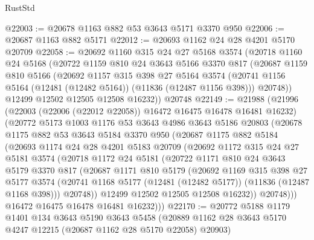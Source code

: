 \begin{lexlean}{RustStd}
\begin{coremodule}
@22003 := @20678 @1163 @882 @53 @3643 @5171 @3370 @950
@22006 := @20687 @1163 @882 @5171
@22012 := @20693 @1162 @24 @28 @4201 @5170 @20709
@22058 := @20692
    @1160
    @315
    @24
    @27
    @5168
    @3574
    (@20718
      @1160
      @24
      @5168
      (@20722
        @1159
        @810
        @24
        @3643
        @5166
        @3370
        @817
        (@20687
          @1159
          @810
          @5166
          (@20692
            @1157
            @315
            @398
            @27
            @5164
            @3574
            (@20741 @1156 @5164 (@12481 (@12482 @5164)) (@11836 (@12487 @1156 @398)))
            @20748))
        @12499
        @12502
        @12505
        @12508
        @16232))
    @20748
@22149 := @21988
    (@21996
      (@22003 (@22006 (@22012 @22058)) @16472 @16475 @16478 @16481 @16232)
      (@20772
        @5173
        @1003
        @1176
        @53
        @3643
        @4986
        @3643
        @5186
        @20803
        (@20678
          @1175
          @882
          @53
          @3643
          @5184
          @3370
          @950
          (@20687
            @1175
            @882
            @5184
            (@20693
              @1174
              @24
              @28
              @4201
              @5183
              @20709
              (@20692
                @1172
                @315
                @24
                @27
                @5181
                @3574
                (@20718
                  @1172
                  @24
                  @5181
                  (@20722
                    @1171
                    @810
                    @24
                    @3643
                    @5179
                    @3370
                    @817
                    (@20687
                      @1171
                      @810
                      @5179
                      (@20692
                        @1169
                        @315
                        @398
                        @27
                        @5177
                        @3574
                        (@20741 @1168 @5177 (@12481 (@12482 @5177)) (@11836 (@12487 @1168 @398)))
                        @20748))
                    @12499
                    @12502
                    @12505
                    @12508
                    @16232))
                @20748)))
          @16472
          @16475
          @16478
          @16481
          @16232)))
@22170 := @20772
    @5188
    @1179
    @1401
    @134
    @3643
    @5190
    @3643
    @5458
    (@20889 @1162 @28 @3643 @5170 @4247 @12215 (@20687 @1162 @28 @5170 @22058) @20903)

\end{coremodule}
\end{lexlean}
